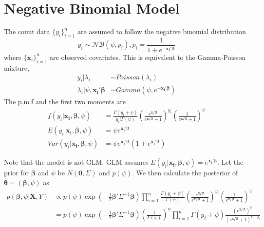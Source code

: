 \documentclass[11pt, oneside]{article}
\begin{document}
\section{Negative Binomial Model}
The count data $\{y_i\}_{i=1}^n$ are assumed to follow the negative binomial distribution
\begin{equation}
y_i \sim \mathcal{NB}(\psi, p_i), p_i = \frac{1}{1 + e^{-\bm{x_i'\beta}}}
\end{equation}
where  $\{{\bm x_i}\}_{i=1}^n$ are observed covariates. This is equivalent to the Gamma-Poisson mixture,
\begin{align}
y_i | \lambda_i &\sim Poisson(\lambda_i) \\
\lambda_i | \psi, \bm{x_i'\beta} &\sim Gamma(\psi, e^{\bm{-x_i'\beta}})
\end{align}
The p.m.f and the first two moments are
\begin{align}
f(y_i | \bm{x_i, \beta}, \psi) &= \frac{\Gamma(y_i + \psi)}{y_i!\Gamma(\psi)} \left(\frac{e^{\bm{x_i'\beta}}}{e^{\bm{x_i'\beta}} + 1}\right)^{y_i}  \left(\frac{1}{e^{\bm{x_i'\beta}} + 1}\right)^{\psi} \\
E(y_i | \bm{x_i, \beta}, \psi) &= \psi e^{\bm{x_i'\beta}} \\
Var(y_i | \bm{x_i, \beta}, \psi) &= \psi e^{\bm{x_i'\beta}} \left(1 + e^{\bm{x_i'\beta}}\right)
\end{align}

Note that the model is not GLM. GLM assumes $E(y_i | \bm{x_i, \beta}, \psi) = e^{\bm{x_i'\beta}}$. Let the prior for $\bm\beta$ and $\psi$ be $N(\bm{0}, \Sigma)$ and $p(\psi)$. We then calculate the posterior of ${\bm\theta} = ({\bm\beta}, \psi)$ as 
\begin{align}
p({\bm \beta}, \psi | {\bm X, Y}) &\propto p(\psi) \exp\left(-\frac{1}{2} \bm{\beta'} \Sigma^{-1} {\bm\beta}\right) \prod_{i=1}^n \frac{\Gamma(y_i + \psi)}{\Gamma(\psi)} \left(\frac{e^{\bm{x_i'\beta}}}{e^{\bm{x_i'\beta}} + 1}\right)^{y_i}  \left(\frac{1}{e^{\bm{x_i'\beta}} + 1}\right)^{\psi} \\
&= p(\psi) \exp\left(-\frac{1}{2} \bm{\beta'} \Sigma^{-1} {\bm\beta}\right) \left(\frac{1}{\Gamma(\psi)}\right)^n \prod_{i=1}^n  \Gamma(y_i + \psi)\frac{\left(e^{\bm{x_i'\beta}}\right)^{y_i} }{\left(e^{\bm{x_i'\beta}} + 1\right)^{\psi + y_i}} 
\end{align}
\end{document}
